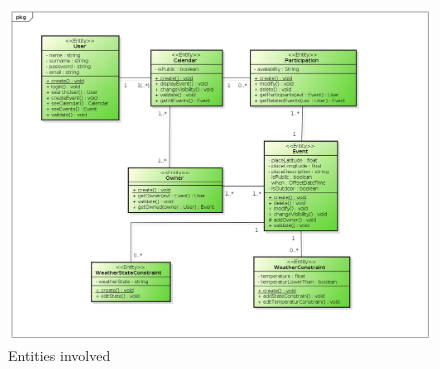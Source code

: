 \begin{itemize}
 \begin{center}
 \begin{figure}[H]
    \includegraphics[width=1\textwidth]{./BCEDiagram/BCE/EntityOverview/Entity.png}
    \caption{Entities involved}
     \label{fig:entityovervie}
     \end{figure}
   \end{center}  



\end{itemize}
